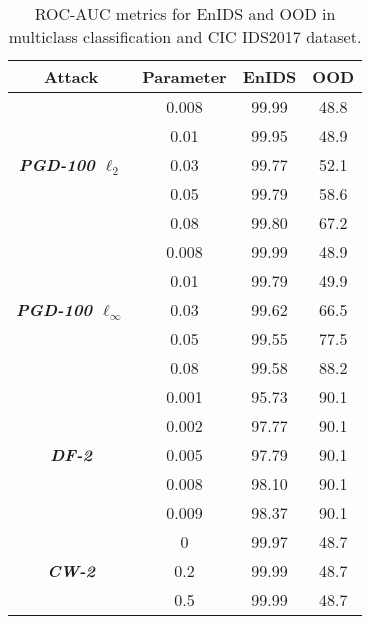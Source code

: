 \documentclass[conference]{IEEEtran}
\begin{document}
	
	
	\begin{table}[H]
		\caption{ROC-AUC metrics for EnIDS and OOD in multiclass classification and CIC IDS2017 dataset.}
		\small
		\setlength{\tabcolsep}{1pt}
		\centering
		\label{tab:cic_multi_ood}
		
		\begin{tabular}{|c|c|c|c|}
			\hline
			\textbf{Attack} & \textbf{Parameter} & \textbf{EnIDS} & \textbf{OOD}
			\\
			\hline
			\multirow{5}{*}{\textbf{\textsl{PGD-100 $\ell_2$}}} & 0.008 & 99.99 & 48.8
			\\
			
			& 0.01 & 99.95 & 48.9
			\\
			
			& 0.03 & 99.77 & 52.1
			\\
			
			& 0.05 & 99.79 & 58.6
			\\
			
			& 0.08 & 99.80 & 67.2
			\\
			\hline
			\multirow{5}{*}{\textbf{\textsl{PGD-100 $\ell_\infty$}}} & 0.008 & 99.99 & 48.9
			\\
			
			& 0.01 & 99.79 & 49.9
			\\
			
			& 0.03 & 99.62 & 66.5
			\\
			
			& 0.05 & 99.55 & 77.5
			\\
			
			& 0.08 & 99.58 & 88.2
			\\
			\hline
			\multirow{5}{*}{\textbf{\textsl{DF-2}}} & 0.001 & 95.73 & 90.1
			\\
			
			& 0.002 & 97.77 & 90.1
			\\
			
			& 0.005 & 97.79 & 90.1
			\\
			
			& 0.008 & 98.10 & 90.1
			\\
			
			& 0.009 & 98.37 & 90.1
			\\
			\hline
			\multirow{5}{*}{\textbf{\textsl{CW-2}}} & 0 & 99.97 & 48.7
			\\
			
			& 0.2 & 99.99 & 48.7
			\\
			
			& 0.5 & 99.99 & 48.7
			\\
			

\end{tabular}
\end{table}
\end{document}
